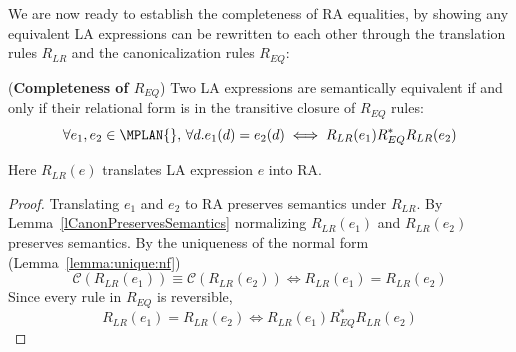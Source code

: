 We are now ready to establish the completeness of RA equalities, by
showing any equivalent LA expressions can be rewritten to each other
through the translation rules $R_{LR}$ and the canonicalization rules
$R_{EQ}$:

\begin{theorem} (\textbf{Completeness of $R_{EQ}$}) Two LA expressions
  are semantically equivalent if and only if their relational form is in the
  transitive closure of $R_{EQ}$ rules:
\[\forall e_1, e_2 \in \MPLAN{},\, \forall d. e_1(d) = e_2(d) 
\iff R_{LR}(e_1) R_{EQ}^* R_{LR}(e_2)\]
\end{theorem}
Here $R_{LR}(e)$ translates LA expression $e$ into RA.

\begin{proof}
  Translating $e_1$ and $e_2$ to RA preserves semantics under
  $R_{LR}$. By Lemma~\ref{lCanonPreservesSemantics} normalizing
  $R_{LR}(e_1)$ and $R_{LR}(e_2)$ preserves semantics. By the
  uniqueness of the normal form (Lemma~\ref{lemma:unique:nf})
  \[\mathcal{C}(R_{LR}(e_1)) \equiv \mathcal{C}(R_{LR}(e_2)) \iff
    R_{LR}(e_1) = R_{LR}(e_2)\] Since every rule in $R_{EQ}$ is
  reversible,
  \[R_{LR}(e_1) = R_{LR}(e_2) \iff R_{LR}(e_1) R_{EQ}^* R_{LR}(e_2)\]
\end{proof}
